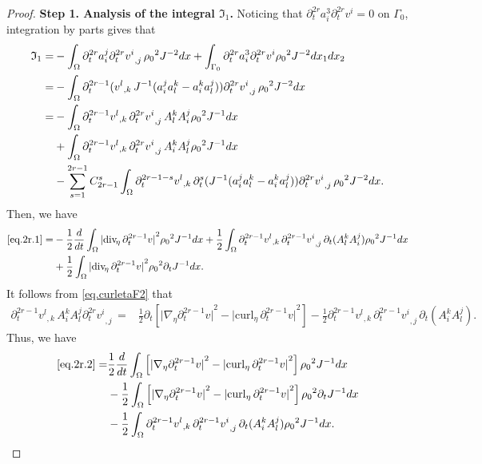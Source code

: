 \documentclass[12pt,twoside,reqno]{amsart}
\numberwithin{equation}{section}
\theoremstyle{definition}
\theoremstyle{remark}
\begin{document}
\begin{proof}
\textbf{Step 1. Analysis of the integral ${\mathfrak{I}}_1$.} Noticing that ${\partial}_t^{2r}a^3_i{\partial}_t^{2r}v^i=0$ on $\Gamma_0$, integration by parts gives that
\begin{align}
  {\mathfrak{I}}_1=&-\int_\Omega {\partial}_t^{2r}a^j_i {{{{\partial}_t^{2r}v^i}}_{,{j}}\,}{\rho_0}^2  J^{-2}dx+\int_{\Gamma_0}{\partial}_t^{2r}a^3_i{\partial}_t^{2r}v^i {\rho_0}^2  J^{-2} dx_1dx_2{\nonumber}\\
  =&-\int_\Omega {\partial}_t^{2r-1}({{{v^l}}_{,{k}}\,} J^{-1}(a_i^ja_l^k-a_i^ka_l^j)){{{{\partial}_t^{2r}v^i}}_{,{j}}\,}{\rho_0}^2  J^{-2}dx{\nonumber}\\
  =&-\int_\Omega {\partial}_t^{2r-1}{{{v^l}}_{,{k}}\,}{{{{\partial}_t^{2r}v^i}}_{,{j}}\,}A_l^k A_i^j{\rho_0}^2  J^{-1}dx\label{eq.2r.1}\\
  &+\int_\Omega {\partial}_t^{2r-1}{{{v^l}}_{,{k}}\,}{{{{\partial}_t^{2r}v^i}}_{,{j}}\,}A_i^kA_l^j{\rho_0}^2  J^{-1} dx\label{eq.2r.2}\\
  &-\sum_{s=1}^{2r-1}C_{2r-1}^s\int_\Omega {\partial}_t^{2r-1-s}{{{v^l}}_{,{k}}\,}{\partial}_t^s(J^{-1}(a_i^ja_l^k-a_i^ka_l^j)){{{{\partial}_t^{2r}v^i}}_{,{j}}\,}{\rho_0}^2  J^{-2}dx.\label{eq.2r.3}
\end{align}
Then, we have
\begin{align*}
  \eqref{eq.2r.1}=&-\frac{1}{2}\frac{d}{dt}\int_\Omega {\vert{{\mathrm{div}_{\!\eta}\,} {\partial}_t^{2r-1} v}\vert}^2{\rho_0}^2  J^{-1}dx+\frac{1}{2}\int_\Omega {\partial}_t^{2r-1}{{{v^l}}_{,{k}}\,} {{{{\partial}_t^{2r-1}v^i}}_{,{j}}\,}{\partial}_t(A_l^k A_{i}^j){\rho_0}^2  J^{-1}dx\\
  &+\frac{1}{2}\int_\Omega {\vert{{\mathrm{div}_{\!\eta}\,} {\partial}_t^{2r-1} v}\vert}^2{\rho_0}^2 {\partial}_t J^{-1}dx.
\end{align*}
It follows from \eqref{eq.curletaF2} that
\begin{align*}
  {\partial}_t^{2r-1}{{{v^l}}_{,{k}}\,} A_i^kA_l^j{{{{\partial}_t^{2r}v^i}}_{,{j}}\,}=&\frac{1}{2}{\partial}_t\left[{\vert{{\nabla}_\eta {\partial}_t^{2r-1}v}\vert}^2-{\vert{{\mathrm{curl}_\eta\,} {\partial}_t^{2r-1}v}\vert}^2\right]-\frac{1}{2}{\partial}_t^{2r-1}{{{v^l}}_{,{k}}\,} {{{{\partial}_t^{2r-1}v^i}}_{,{j}}\,}{\partial}_t(A_i^kA_l^j).
\end{align*}
Thus, we have
\begin{align*}
  \eqref{eq.2r.2}=&\frac{1}{2}\frac{d}{dt}\int_\Omega \left[{\vert{{\nabla}_\eta {\partial}_t^{2r-1}v}\vert}^2-{\vert{{\mathrm{curl}_\eta\,} {\partial}_t^{2r-1}v}\vert}^2\right]{\rho_0}^2  J^{-1}dx\\
  &-\frac{1}{2}\int_\Omega \left[{\vert{{\nabla}_\eta {\partial}_t^{2r-1}v}\vert}^2-{\vert{{\mathrm{curl}_\eta\,} {\partial}_t^{2r-1}v}\vert}^2\right]{\rho_0}^2  {\partial}_t J^{-1}dx\\
  &-\frac{1}{2}\int_\Omega {\partial}_t^{2r-1}{{{v^l}}_{,{k}}\,} {{{{\partial}_t^{2r-1}v^i}}_{,{j}}\,}{\partial}_t(A_i^kA_l^j){\rho_0}^2  J^{-1}dx.
\end{align*}


\end{proof}
\end{document}

